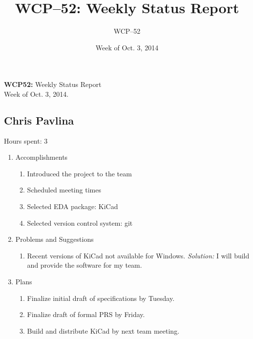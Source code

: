\documentclass{article}
\title{WCP--52: Weekly Status Report}
\date{Week of Oct. 3, 2014}
\author{WCP--52}
\begin{document}
\noindent \textbf{WCP52:} Weekly Status Report \\
Week of Oct. 3, 2014.

\subsection*{Chris Pavlina}
Hours spent: 3
\begin{enumerate}
\item{Accomplishments
    \begin{enumerate}
    \item{Introduced the project to the team}
    \item{Scheduled meeting times}
    \item{Selected EDA package: KiCad}
    \item{Selected version control system: git}
    \end{enumerate}
}
\item{Problems and Suggestions
    \begin{enumerate}
    \item{Recent versions of KiCad not available for Windows. \emph{Solution:} I will build and provide the
        software for my team.}
    \end{enumerate}
}
\item{Plans
    \begin{enumerate}
    \item{Finalize initial draft of specifications by Tuesday.}
    \item{Finalize draft of formal PRS by Friday.}
    \item{Build and distribute KiCad by next team meeting.}
    \end{enumerate}
}
\end{enumerate}
\end{document}
